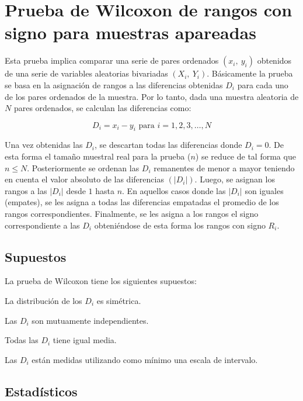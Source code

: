 \documentclass[]{book}
\theoremstyle{definition}
\theoremstyle{definition}
\theoremstyle{definition}
\theoremstyle{remark}
\begin{document}
\hypertarget{prueba-de-wilcoxon-de-rangos-con-signo-para-muestras-apareadas}{%
\section{Prueba de Wilcoxon de rangos con signo para muestras
apareadas}\label{prueba-de-wilcoxon-de-rangos-con-signo-para-muestras-apareadas}}

Esta prueba implica comparar una serie de pares ordenados
\((x_{i},\ y_{i})\) obtenidos de una serie de variables aleatorias
bivariadas \((X_{i},\ Y_{i})\). Básicamente la prueba se basa en la
asignación de rangos a las diferencias obtenidas \(D_{i}\) para cada uno
de los pares ordenados de la muestra. Por lo tanto, dada una muestra
aleatoria de \(N\) pares ordenados, se calculan las diferencias como:

\[
D_{i} = x_{i} - y_{i}\text{ para }i = 1, 2, 3,\ldots, N
\]

Una vez obtenidas las \(D_{i}\), se descartan todas las diferencias
donde \(D_{i} = 0\). De esta forma el tamaño muestral real para la
prueba (\(n\)) se reduce de tal forma que \(n \leq N\). Posteriormente
se ordenan las \(D_{i}\) remanentes de menor a mayor teniendo en cuenta
el valor absoluto de las diferencias \((\left| D_{i} \right|)\). Luego,
se asignan los rangos a las \(|D_{i}|\) desde \(1\) hasta \(n\). En
aquellos casos donde las \(|D_{i}|\) son iguales (empates), se les
asigna a todas las diferencias empatadas el promedio de los rangos
correspondientes. Finalmente, se les asigna a los rangos el signo
correspondiente a las \(D_{i}\) obteniéndose de esta forma los rangos
con signo \(R_{i}\).

\hypertarget{supuestos-1}{%
\subsection{Supuestos}\label{supuestos-1}}

La prueba de Wilcoxon tiene los siguientes supuestos:

La distribución de los \(D_{i}\) es simétrica.

Las \(D_{i}\) son mutuamente independientes.

Todas las \(D_{i}\) tiene igual media.

Las \(D_{i}\) están medidas utilizando como mínimo una escala de
intervalo.

\hypertarget{estadisticos-1}{%
\subsection{Estadísticos}\label{estadisticos-1}}
\end{document}
